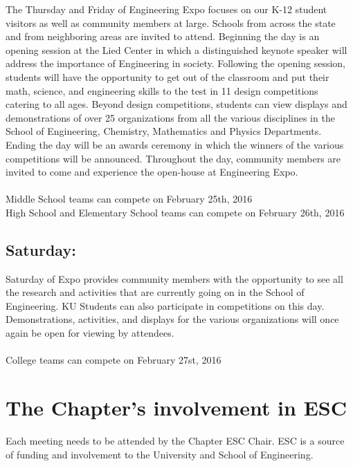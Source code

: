 The Thursday and Friday of Engineering Expo focuses on our K-12 student visitors as well as community members at large. Schools from across the state and from neighboring areas are invited to attend. Beginning the day is an opening session at the Lied Center in which a distinguished keynote speaker will address the importance of Engineering in society. Following the opening session, students will have the opportunity to get out of the classroom and put their math, science, and engineering skills to the test in 11 design competitions catering to all ages. Beyond design competitions, students can view displays and demonstrations of over 25 organizations from all the various disciplines in the School of Engineering, Chemistry, Mathematics and Physics Departments.  Ending the day will be an awards ceremony in which the winners of the various competitions will be announced. Throughout the day, community members are invited to come and experience the open-house at Engineering Expo.
\\
\\
Middle School teams can compete on February 25th, 2016
\\
High School and Elementary School teams can compete on February 26th, 2016 

\subsection*{Saturday:}

Saturday of Expo provides community members with the opportunity to see all the research and activities that are currently going on in the School of Engineering. KU Students can also participate in competitions on this day. Demonstrations, activities, and displays for the various organizations will once again be open for viewing by attendees. 
\\
\\
College teams can compete on February 27st, 2016

\section{The Chapter's involvement in ESC}

Each meeting needs to be attended by the Chapter ESC Chair. ESC is a source of funding and involvement to the University and School of Engineering.

